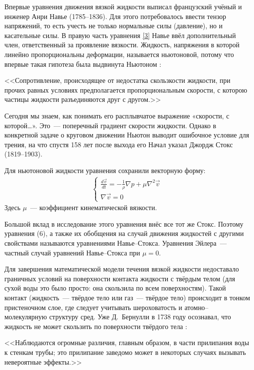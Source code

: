 Впервые уравнения движения вязкой жидкости выписал французский учёный и инженер Анри Навье (1785--1836). 
Для этого потребовалось ввести тензор напряжений, то есть учесть не только нормальные силы (давление), но 
и касательные силы. В правую часть уравнения \ref{3} Навье ввёл дополнительный член, ответственный за 
проявление вязкости. Жидкость, напряжения в которой линейно пропорциональны деформации, называется ньютоновой, 
потому что впервые такая гипотеза была выдвинута Ньютоном \cite{betyaev}:

<<Сопротивление, происходящее от недостатка скользкости жидкости, при прочих равных условиях предполагается 
пропорциональным скорости, с которою частицы жидкости разъединяются друг с другом.>>

Сегодня мы знаем, как понимать его расплывчатое выражение «скорости, с которой…». Это~--- поперечный градиент 
скорости жидкости. Однако в конкретной задаче о круговом движении Ньютон выводит ошибочное условие для трения, 
на что спустя 158 лет после выхода его Начал указал Джордж Стокс (1819--1903).

Для ньютоновой жидкости уравнения сохранили векторную форму:
\begin{gather}
\begin{cases}
\frac{d \vec v}{d t} = - \frac{1}{\rho} \nabla p + \mu \nabla^2 \vec v \\
\nabla \vec v = 0
\end{cases}
\label{6}
\end{gather}
Здесь $\mu$~--- коэффициент кинематической вязкости.

Большой вклад в исследование этого уравнения внёс все тот же Стокс. Поэтому уравнения (6), а также их 
обобщения на случай движения жидкостей с другими свойствами называются уравнениями Навье--Стокса. Уравнения 
Эйлера~--- частный случай уравнений Навье--Стокса при $\mu=0$.

Для завершения математической модели течения вязкой жидкости недоставало граничных условий на поверхности 
контакта жидкости с твёрдым телом (для сухой воды это было просто: она скользила по всем поверхностям). 
Такой контакт (жидкость~--- твёрдое тело или газ~--- твёрдое тело) происходит в тонком пристеночном слое, 
где следует учитывать шероховатость и атомно--молекулярную структуру сред. Уже Д.~Бернулли в 1738 году 
осознавал, что жидкость не может скользить по поверхности твёрдого тела \cite{betyaev}:

<<Наблюдаются огромные различия, главным образом, в части прилипания воды к стенкам трубы; это прилипание 
заведомо может в некоторых случаях вызывать невероятные эффекты.>>

